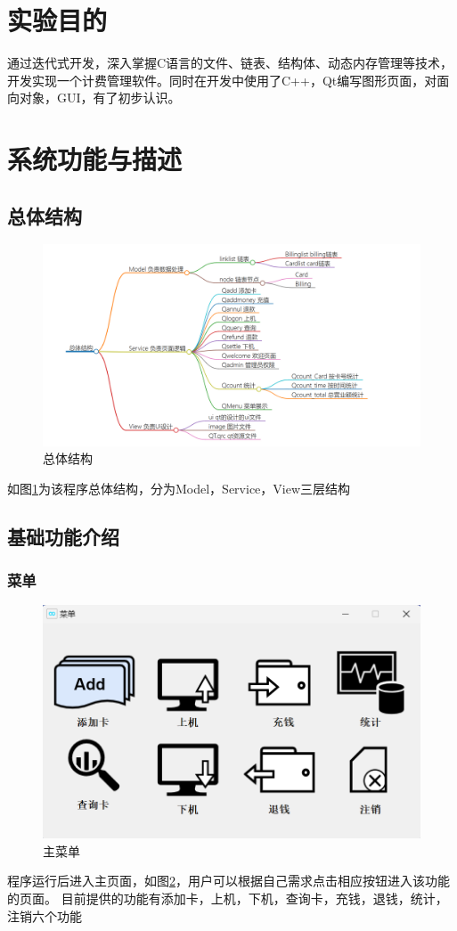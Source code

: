 \documentclass{article}
\begin{document}
    \section{实验目的}
    通过迭代式开发，深入掌握C语言的文件、链表、结构体、动态内存管理等技术，
    开发实现一个计费管理软件。同时在开发中使用了C++，Qt编写图形页面，对面向对象，GUI，有了初步认识。
    \section{系统功能与描述}
    \subsection{总体结构}
    \begin{figure}[hbt]
        \centering
        \includegraphics[scale=0.5]{figure/struct.png}
        \caption{总体结构}
        \label{struct}
    \end{figure}
    如图\ref{struct}为该程序总体结构，分为Model，Service，View三层结构
    \subsection{基础功能介绍}
    \subsubsection{菜单}
        \newpage
        \begin{figure}[h]
            \centering
            \includegraphics[scale=0.8]{figure/menu.png}
            \caption{主菜单}
            \label{main_menu}
        \end{figure}
        程序运行后进入主页面，如图\ref{main_menu}，用户可以根据自己需求点击相应按钮进入该功能的页面。
        目前提供的功能有添加卡，上机，下机，查询卡，充钱，退钱，统计，注销六个功能
\end{document}
